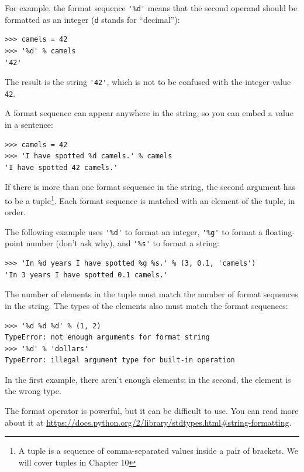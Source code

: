 {

For example, the format sequence \verb"'%d'" means that
the second operand should be formatted as an
integer ({\tt d} stands for ``decimal''):

\beforeverb
\begin{verbatim}
>>> camels = 42
>>> '%d' % camels
'42'
\end{verbatim}
\afterverb
%
The result is the string \verb"'42'", which is not to be confused
with the integer value {\tt 42}.

A format sequence can appear anywhere in the string,
so you can embed a value in a sentence:

\beforeverb
\begin{verbatim}
>>> camels = 42
>>> 'I have spotted %d camels.' % camels
'I have spotted 42 camels.'
\end{verbatim}
\afterverb
%
If there is more than one format sequence in the string,
the second argument has to be a tuple\footnote{A tuple is a
sequence of comma-separated values inside a pair of brackets.
We will cover tuples in Chapter 10}.  Each format sequence is
matched with an element of the tuple, in order.

The following example uses \verb"'%d'" to format an integer,
\verb"'%g'" to format
a floating-point number (don't ask why), and \verb"'%s'" to format
a string:

\beforeverb
\begin{verbatim}
>>> 'In %d years I have spotted %g %s.' % (3, 0.1, 'camels')
'In 3 years I have spotted 0.1 camels.'
\end{verbatim}
\afterverb
%
The number of elements in the tuple must match the number
of format sequences in the string.  The types of the
elements also must match the format sequences:


\beforeverb
\begin{verbatim}
>>> '%d %d %d' % (1, 2)
TypeError: not enough arguments for format string
>>> '%d' % 'dollars'
TypeError: illegal argument type for built-in operation
\end{verbatim}
\afterverb
%
In the first example, there aren't enough elements; in the
second, the element is the wrong type.

The format operator is powerful, but it can be difficult to use.  You
can read more about it at
\url{https://docs.python.org/2/library/stdtypes.html#string-formatting}.

}
